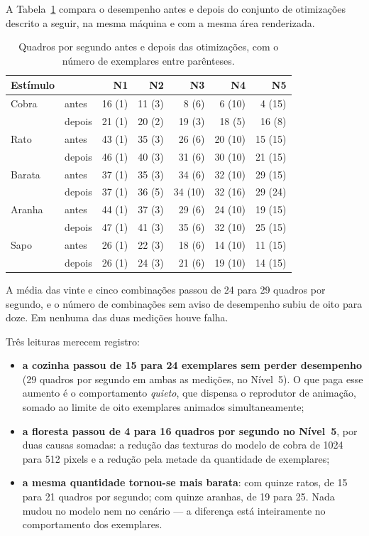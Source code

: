 A Tabela~\ref{tab:desempenho} compara o desempenho antes e depois do
conjunto de otimizações descrito a seguir, na mesma máquina e com a mesma
área renderizada.

\begin{table}[htbp]
\centering
\caption{Quadros por segundo antes e depois das otimizações, com o
número de exemplares entre parênteses.}
\label{tab:desempenho}
\begin{tabular}{llrrrrr}
\toprule
\textbf{Estímulo} & & \textbf{N1} & \textbf{N2} & \textbf{N3} & \textbf{N4} & \textbf{N5} \\
\midrule
Cobra  & antes  & 16 (1) & 11 (3) & 8 (6)  & 6 (10)  & 4 (15) \\
       & depois & 21 (1) & 20 (2) & 19 (3) & 18 (5)  & 16 (8) \\
\addlinespace
Rato   & antes  & 43 (1) & 35 (3) & 26 (6) & 20 (10) & 15 (15) \\
       & depois & 46 (1) & 40 (3) & 31 (6) & 30 (10) & 21 (15) \\
\addlinespace
Barata & antes  & 37 (1) & 35 (3) & 34 (6)  & 32 (10) & 29 (15) \\
       & depois & 37 (1) & 36 (5) & 34 (10) & 32 (16) & 29 (24) \\
\addlinespace
Aranha & antes  & 44 (1) & 37 (3) & 29 (6) & 24 (10) & 19 (15) \\
       & depois & 47 (1) & 41 (3) & 35 (6) & 32 (10) & 25 (15) \\
\addlinespace
Sapo   & antes  & 26 (1) & 22 (3) & 18 (6) & 14 (10) & 11 (15) \\
       & depois & 26 (1) & 24 (3) & 21 (6) & 19 (10) & 14 (15) \\
\bottomrule
\end{tabular}
\end{table}

A média das vinte e cinco combinações passou de 24 para 29 quadros por
segundo, e o número de combinações sem aviso de desempenho subiu de oito
para doze. Em nenhuma das duas medições houve falha.

Três leituras merecem registro:

\begin{itemize}
  \item \textbf{a cozinha passou de 15 para 24 exemplares sem perder
  desempenho} (29 quadros por segundo em ambas as medições, no Nível~5).
  O que paga esse aumento é o comportamento \emph{quieto}, que dispensa
  o reprodutor de animação, somado ao limite de oito exemplares animados
  simultaneamente;

  \item \textbf{a floresta passou de 4 para 16 quadros por segundo no
  Nível~5}, por duas causas somadas: a redução das texturas do modelo de
  cobra de 1024 para 512 pixels e a redução pela metade da quantidade de
  exemplares;

  \item \textbf{a mesma quantidade tornou-se mais barata}: com quinze
  ratos, de 15 para 21 quadros por segundo; com quinze aranhas, de 19
  para 25. Nada mudou no modelo nem no cenário --- a diferença está
  inteiramente no comportamento dos exemplares.
\end{itemize}

